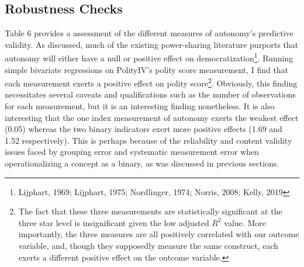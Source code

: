\documentclass[12pt]{article}
\begin{document}
\subsection{Robustness Checks}

Table 6 provides a assessment of the different measures of autonomy's predictive validity. As discussed, much of the existing power-sharing literature purports that autonomy will either have a null or positive effect on democratization\footnote{Lijphart, 1969; Lijphart, 1975; Nordlinger, 1974; Norris, 2008; Kelly, 2019}. Running simple bivariate regressions on PolityIV's polity score measurement, I find that each measurement exerts a positive effect on polity score\footnote{The fact that these three measurements are statistically significant at the three star level is insignificant given the low adjusted $R^2$ value. More importantly, the three measures are all positively correlated with our outcome variable, and, though they supposedly measure the same construct, each exerts a different positive effect on the outcome variable.}. Obviously, this finding necessitates several caveats and qualifications such as the number of observations for each measurement, but it is an interesting finding nonetheless. It is also interesting that the one index measurement of autonomy exerts the weakest effect (0.05) whereas the two binary indicators exert more positive effects (1.69 and 1.52 respectively). This is perhaps because of the reliability and content validity issues faced by grouping error and systematic measurement error when operationalizing a concept as a binary, as was discussed in previous sections.  
\end{document}
